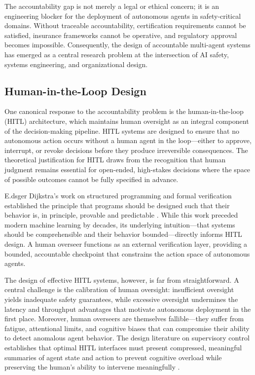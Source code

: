The accountability gap is not merely a legal or ethical concern; it is an engineering blocker for the deployment of autonomous agents in safety-critical domains. Without traceable accountability, certification requirements cannot be satisfied, insurance frameworks cannot be operative, and regulatory approval becomes impossible. Consequently, the design of accountable multi-agent systems has emerged as a central research problem at the intersection of AI safety, systems engineering, and organizational design.

\subsection{Human-in-the-Loop Design}

One canonical response to the accountability problem is the human-in-the-loop (HITL) architecture, which maintains human oversight as an integral component of the decision-making pipeline. HITL systems are designed to ensure that no autonomous action occurs without a human agent in the loop—either to approve, interrupt, or revoke decisions before they produce irreversible consequences. The theoretical justification for HITL draws from the recognition that human judgment remains essential for open-ended, high-stakes decisions where the space of possible outcomes cannot be fully specified in advance.

E.dsger Dijkstra's work on structured programming and formal verification established the principle that programs should be designed such that their behavior is, in principle, provable and predictable \cite{dijkstra1982}. While this work preceded modern machine learning by decades, its underlying intuition—that systems should be comprehensible and their behavior bounded—directly informs HITL design. A human overseer functions as an external verification layer, providing a bounded, accountable checkpoint that constrains the action space of autonomous agents.

The design of effective HITL systems, however, is far from straightforward. A central challenge is the calibration of human oversight: insufficient oversight yields inadequate safety guarantees, while excessive oversight undermines the latency and throughput advantages that motivate autonomous deployment in the first place. Moreover, human overseers are themselves fallible—they suffer from fatigue, attentional limits, and cognitive biases that can compromise their ability to detect anomalous agent behavior. The design literature on supervisory control establishes that optimal HITL interfaces must present compressed, meaningful summaries of agent state and action to prevent cognitive overload while preserving the human's ability to intervene meaningfully \cite{tristr81}.


